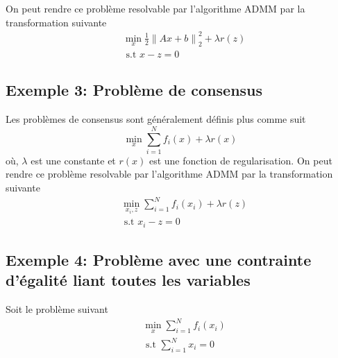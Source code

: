 \documentclass[12pt,a4paper]{report}
\begin{document}
            	On peut rendre ce problème resolvable par l'algorithme ADMM par la transformation suivante
            	\begin{equation*}
                	\begin{aligned}
                    	& \min_{x} \frac{1}{2}{\| Ax + b \| }_2^2 + \lambda r(z) \\
                    	& \text{ s.t  $x - z = 0$ }
                	\end{aligned}
            	\end{equation*}

        	\subsection*{Exemple 3: Problème de consensus}
       	 
            	Les problèmes de consensus sont généralement définis plus comme suit
            	\begin{equation*}
                	\min_{x} \sum_{i=1}^{N} f_i(x) + \lambda r(x)
            	\end{equation*}
            	où, $\lambda$ est une constante et $r(x)$ est une fonction de regularisation.
            	On peut rendre ce problème resolvable par l'algorithme ADMM par la transformation suivante
            	\begin{equation*}
                	\begin{aligned}
                    	& \min_{x_i,z} \sum_{i=1}^{N} f_i(x_i) + \lambda r(z) \\
                    	& \text{ s.t  $x_i - z = 0$ }
                	\end{aligned}
            	\end{equation*}

        	\subsection*{Exemple 4: Problème avec une contrainte d'égalité liant toutes les variables}
           	 
            	Soit le problème suivant
            	\begin{equation*}
                	\begin{aligned}
                    	& \min_{x} \sum_{i=1}^{N} f_i(x_i) \\
                    	& \text{ s.t  $\sum_{i=1}^{N} x_i = 0$ }
                	\end{aligned}
            	\end{equation*}
           	 
\end{document}

